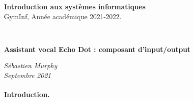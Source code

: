 \documentclass[12pt,svgnames]{article}
\begin{document}


\begin{large}\textcolor{airforceblue}{\textbf{Introduction aux systèmes informatiques} \\
GymInf,  Année académique 2021-2022.}
\end{large}\\
\begin{Large}
\begin{center}
   \textcolor{airforceblue}{\textbf{Assistant vocal Echo Dot : composant d'input/output}}\\[.1cm]
\end{center}
\end{Large}
\textit{Sébastien Murphy}\\
\textit{Septembre 2021}\\
\\[.4cm]



\textbf{Introduction.}



\end{document}
